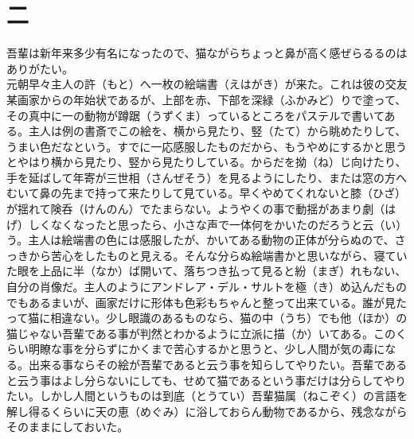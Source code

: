 \documentclass{book}
\begin{document}
\chapter*{二}
吾輩は新年来多少有名になったので、猫ながらちょっと鼻が高く感ぜらるるのはありがたい。\\
元朝早々主人の許（もと）へ一枚の絵端書（えはがき）が来た。これは彼の交友某画家からの年始状であるが、上部を赤、下部を深緑（ふかみど）りで塗って、その真中に一の動物が蹲踞（うずくま）っているところをパステルで書いてある。主人は例の書斎でこの絵を、横から見たり、竪（たて）から眺めたりして、うまい色だなという。すでに一応感服したものだから、もうやめにするかと思うとやはり横から見たり、竪から見たりしている。からだを拗（ね）じ向けたり、手を延ばして年寄が三世相（さんぜそう）を見るようにしたり、または窓の方へむいて鼻の先まで持って来たりして見ている。早くやめてくれないと膝（ひざ）が揺れて険呑（けんのん）でたまらない。ようやくの事で動揺があまり劇（はげ）しくなくなったと思ったら、小さな声で一体何をかいたのだろうと云（い）う。主人は絵端書の色には感服したが、かいてある動物の正体が分らぬので、さっきから苦心をしたものと見える。そんな分らぬ絵端書かと思いながら、寝ていた眼を上品に半（なか）ば開いて、落ちつき払って見ると紛（まぎ）れもない、自分の肖像だ。主人のようにアンドレア・デル・サルトを極（き）め込んだものでもあるまいが、画家だけに形体も色彩もちゃんと整って出来ている。誰が見たって猫に相違ない。少し眼識のあるものなら、猫の中（うち）でも他（ほか）の猫じゃない吾輩である事が判然とわかるように立派に描（か）いてある。このくらい明瞭な事を分らずにかくまで苦心するかと思うと、少し人間が気の毒になる。出来る事ならその絵が吾輩であると云う事を知らしてやりたい。吾輩であると云う事はよし分らないにしても、せめて猫であるという事だけは分らしてやりたい。しかし人間というものは到底（とうてい）吾輩猫属（ねこぞく）の言語を解し得るくらいに天の恵（めぐみ）に浴しておらん動物であるから、残念ながらそのままにしておいた。\\
\end{document}
